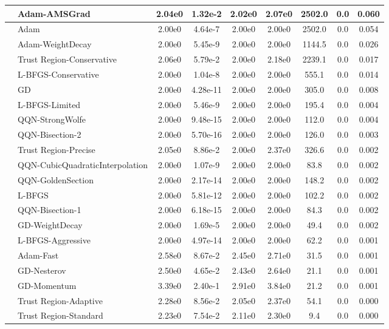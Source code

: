 \documentclass{article}
\begin{document}
\begin{longtable}{|l|l|c|c|c|c|c|c|c|}
\hline
 & Adam-AMSGrad & 2.04e0 & 1.32e-2 & 2.02e0 & 2.07e0 & 2502.0 & 0.0 & 0.060 \\
\hline
 & Adam & 2.00e0 & 4.64e-7 & 2.00e0 & 2.00e0 & 2502.0 & 0.0 & 0.054 \\
\hline
 & Adam-WeightDecay & 2.00e0 & 5.45e-9 & 2.00e0 & 2.00e0 & 1144.5 & 0.0 & 0.026 \\
\hline
 & Trust Region-Conservative & 2.06e0 & 5.79e-2 & 2.00e0 & 2.18e0 & 2239.1 & 0.0 & 0.017 \\
\hline
 & L-BFGS-Conservative & 2.00e0 & 1.04e-8 & 2.00e0 & 2.00e0 & 555.1 & 0.0 & 0.014 \\
\hline
 & GD & 2.00e0 & 4.28e-11 & 2.00e0 & 2.00e0 & 305.0 & 0.0 & 0.008 \\
\hline
 & L-BFGS-Limited & 2.00e0 & 5.46e-9 & 2.00e0 & 2.00e0 & 195.4 & 0.0 & 0.004 \\
\hline
 & QQN-StrongWolfe & 2.00e0 & 9.48e-15 & 2.00e0 & 2.00e0 & 112.0 & 0.0 & 0.004 \\
\hline
 & QQN-Bisection-2 & 2.00e0 & 5.70e-16 & 2.00e0 & 2.00e0 & 126.0 & 0.0 & 0.003 \\
\hline
 & Trust Region-Precise & 2.05e0 & 8.86e-2 & 2.00e0 & 2.37e0 & 326.6 & 0.0 & 0.002 \\
\hline
 & QQN-CubicQuadraticInterpolation & 2.00e0 & 1.07e-9 & 2.00e0 & 2.00e0 & 83.8 & 0.0 & 0.002 \\
\hline
 & QQN-GoldenSection & 2.00e0 & 2.17e-14 & 2.00e0 & 2.00e0 & 148.2 & 0.0 & 0.002 \\
\hline
 & L-BFGS & 2.00e0 & 5.81e-12 & 2.00e0 & 2.00e0 & 102.2 & 0.0 & 0.002 \\
\hline
 & QQN-Bisection-1 & 2.00e0 & 6.18e-15 & 2.00e0 & 2.00e0 & 84.3 & 0.0 & 0.002 \\
\hline
 & GD-WeightDecay & 2.00e0 & 1.69e-5 & 2.00e0 & 2.00e0 & 49.4 & 0.0 & 0.002 \\
\hline
 & L-BFGS-Aggressive & 2.00e0 & 4.97e-14 & 2.00e0 & 2.00e0 & 62.2 & 0.0 & 0.001 \\
\hline
 & Adam-Fast & 2.58e0 & 8.67e-2 & 2.45e0 & 2.71e0 & 31.5 & 0.0 & 0.001 \\
\hline
 & GD-Nesterov & 2.50e0 & 4.65e-2 & 2.43e0 & 2.64e0 & 21.1 & 0.0 & 0.001 \\
\hline
 & GD-Momentum & 3.39e0 & 2.40e-1 & 2.91e0 & 3.84e0 & 21.2 & 0.0 & 0.001 \\
\hline
 & Trust Region-Adaptive & 2.28e0 & 8.56e-2 & 2.05e0 & 2.37e0 & 54.1 & 0.0 & 0.000 \\
\hline
 & Trust Region-Standard & 2.23e0 & 7.54e-2 & 2.11e0 & 2.30e0 & 9.4 & 0.0 & 0.000 \\

\end{longtable}
\end{document}
